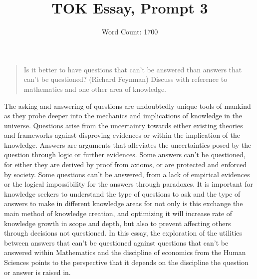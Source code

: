 \documentclass[a4paper,12pt]{article}
\title{\vspace{-8ex}TOK Essay, Prompt 3}
\author{Word Count: 1700}
\date{}
\begin{document}
\maketitle
\begin{quote}
    Is it better to have questions that can't be answered than answers that can't be questioned? (Richard Feynman) Discuss with reference to mathematics and one other area of knowledge.
\end{quote}

The asking and answering of questions are undoubtedly unique tools of mankind as they probe deeper into the mechanics and implications of knowledge in the universe. Questions arise from the uncertainty towards either existing theories and frameworks against disproving evidences or within the implication of the knowledge. Answers are arguments that alleviates the uncertainties posed by the question through logic or further evidences. Some answers can’t be questioned, for either they are derived by proof from axioms, or are protected and enforced by society. Some questions can’t be answered, from a lack of empirical evidences or the logical impossibility for the answers through paradoxes. It is important for knowledge seekers to understand the type of questions to ask and the type of answers to make in different knowledge areas for not only is this exchange the main method of knowledge creation, and optimizing it will increase rate of knowledge growth in scope and depth, but also to prevent affecting others through decisions not questioned. In this essay, the exploration of the utilities between answers that can't be questioned against questions that can't be answered within Mathematics and the discipline of economics from the Human Sciences points to the perspective that it depends on the discipline the question or answer is raised in.

\end{document}
